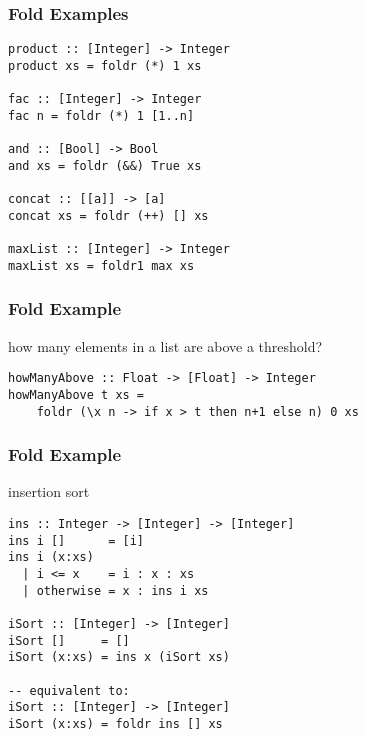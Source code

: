 \documentclass[dvipsnames]{beamer}
\theoremstyle{plain}
\begin{document}
\begin{frame}[fragile]
  \frametitle{Fold Examples}

  \begin{exampleblock}{}
    \begin{lstlisting}
product :: [Integer] -> Integer
product xs = foldr (*) 1 xs

fac :: [Integer] -> Integer
fac n = foldr (*) 1 [1..n]

and :: [Bool] -> Bool
and xs = foldr (&&) True xs

concat :: [[a]] -> [a]
concat xs = foldr (++) [] xs

maxList :: [Integer] -> Integer
maxList xs = foldr1 max xs
    \end{lstlisting}
  \end{exampleblock}
\end{frame}

\begin{frame}[fragile]
  \frametitle{Fold Example}

  \begin{exampleblock}{how many elements in a list are above a threshold?}
    \begin{lstlisting}
howManyAbove :: Float -> [Float] -> Integer
howManyAbove t xs =
    foldr (\x n -> if x > t then n+1 else n) 0 xs
    \end{lstlisting}
  \end{exampleblock}
\end{frame}

\begin{frame}[fragile]
  \frametitle{Fold Example}

  \begin{exampleblock}{insertion sort}
    \begin{lstlisting}
ins :: Integer -> [Integer] -> [Integer]
ins i []      = [i]
ins i (x:xs)
  | i <= x    = i : x : xs
  | otherwise = x : ins i xs

iSort :: [Integer] -> [Integer]
iSort []     = []
iSort (x:xs) = ins x (iSort xs)

-- equivalent to:
iSort :: [Integer] -> [Integer]
iSort (x:xs) = foldr ins [] xs
    \end{lstlisting}
  \end{exampleblock}
\end{frame}
\end{document}
